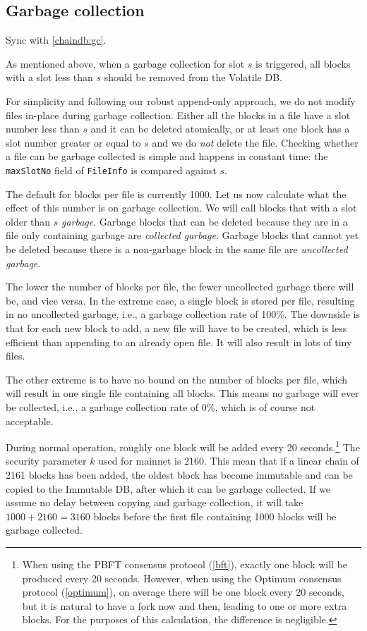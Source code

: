 \subsection{Garbage collection}
\label{volatile:implementation:gc}

 Sync with \cref{chaindb:gc}.

As mentioned above, when a garbage collection for slot $s$ is triggered, all
blocks with a slot less than $s$ should be removed from the Volatile DB.

For simplicity and following our robust append-only approach, we do not modify
files in-place during garbage collection. Either all the blocks in a file have a
slot number less than $s$ and it can be deleted atomically, or at least one
block has a slot number greater or equal to $s$ and we do \emph{not} delete the
file. Checking whether a file can be garbage collected is simple and happens in
constant time: the \lstinline!maxSlotNo! field of \lstinline!FileInfo! is
compared against $s$.

The default for blocks per file is currently \num{1000}. Let us now calculate
what the effect of this number is on garbage collection. We will call blocks
that with a slot older than $s$ \emph{garbage}. Garbage blocks that can be
deleted because they are in a file only containing garbage are \emph{collected
garbage}. Garbage blocks that cannot yet be deleted because there is a
non-garbage block in the same file are \emph{uncollected garbage}.

The lower the number of blocks per file, the fewer uncollected garbage there
will be, and vice versa. In the extreme case, a single block is stored per file,
resulting in no uncollected garbage, i.e., a garbage collection rate of 100\%.
The downside is that for each new block to add, a new file will have to be
created, which is less efficient than appending to an already open file. It will
also result in lots of tiny files.

The other extreme is to have no bound on the number of blocks per file, which
will result in one single file containing all blocks. This means no garbage will
ever be collected, i.e., a garbage collection rate of 0\%, which is of course
not acceptable.

During normal operation, roughly one block will be added every 20
seconds.\footnote{When using the PBFT consensus protocol (\cref{bft}), exactly
one block will be produced every 20 seconds. However, when using the Optimum
consensus protocol (\cref{optimum}), on average there will be one block every 20
seconds, but it is natural to have a fork now and then, leading to one or more
extra blocks. For the purposes of this calculation, the difference is
negligible.} The security parameter $k$ used for mainnet is \num{2160}. This
mean that if a linear chain of \num{2161} blocks has been added, the oldest
block has become immutable and can be copied to the Immutable DB, after which it
can be garbage collected. If we assume no delay between copying and garbage
collection, it will take $\num{1000} + \num{2160} = \num{3160}$ blocks before
the first file containing \num{1000} blocks will be garbage collected.

